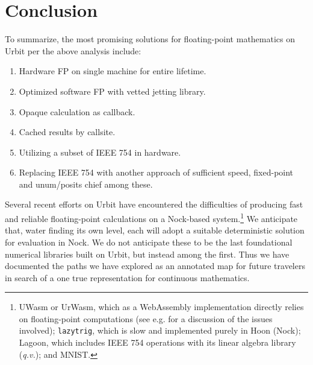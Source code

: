 \documentclass[twoside]{article}
\begin{document}
\section{Conclusion}

To summarize, the most promising solutions for floating-point mathematics on Urbit per the above analysis include:

\begin{enumerate}
  \item  Hardware FP on single machine for entire lifetime.
  \item  Optimized software FP with vetted jetting library.
  \item  Opaque calculation as callback.
  \item  Cached results by callsite.
  \item  Utilizing a subset of IEEE 754 in hardware.
  \item  Replacing IEEE 754 with another approach of sufficient speed, fixed-point and unum/posits chief among these.
\end{enumerate}

Several recent efforts on Urbit have encountered the difficulties of producing fast and reliable floating-point calculations on a Nock-based system.\footnote{UWasm or UrWasm, which as a WebAssembly implementation directly relies on floating-point computations \citep{UWasm} (see e.g. \citet{KloudKoder2022} for a discussion of the issues involved); \texttt{lazytrig}, which is slow and implemented purely in Hoon (Nock); Lagoon, which includes IEEE 754 operations with its linear algebra library (\emph{q.v.}); and MNIST.}  We anticipate that, water finding its own level, each will adopt a suitable deterministic solution for evaluation in Nock.  We do not anticipate these to be the last foundational numerical libraries built on Urbit, but instead among the first.  Thus we have documented the paths we have explored as an annotated map for future travelers in search of a one true representation for continuous mathematics. \tombstone{}

\printbibliography
\end{document}
